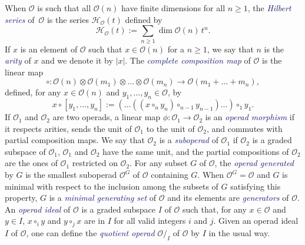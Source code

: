 \documentclass[10pt,reqno]{amsart}
\numberwithin{equation}{subsection}
\renewcommand{\geq}{\geqslant}
\newcommand{\Oca}{\mathcal{O}}
\newcommand{\Hilbert}{\mathcal{H}}
\newcommand{\Def}[1]{\textcolor{MidnightBlue}{\em #1}}
\begin{document}
When $\Oca$ is such that all $\Oca(n)$ have finite dimensions for all
$n \geq 1$, the \Def{Hilbert series} of~$\Oca$ is the series
$\Hilbert_\Oca(t)$ defined by
\begin{equation}
    \Hilbert_\Oca(t) := \sum_{n \geq 1} \dim \Oca(n)\, t^n.
\end{equation}
If $x$ is an element of $\Oca$ such that $x \in \Oca(n)$ for a
$n \geq 1$, we say that $n$ is the \Def{arity} of $x$ and we denote it
by $|x|$. The \Def{complete composition map} of $\Oca$ is the linear map
\begin{equation}
    \circ : \Oca(n) \otimes \Oca(m_1) \otimes \dots \otimes \Oca(m_n)
    \to \Oca(m_1 + \dots + m_n),
\end{equation}
defined, for any $x \in \Oca(n)$ and $y_1, \dots, y_n \in \Oca$, by
\begin{equation}
    x \circ [y_1, \dots, y_n]
    := (\dots ((x \circ_n y_n) \circ_{n - 1} y_{n - 1}) \dots)
    \circ_1 y_1.
\end{equation}
If $\Oca_1$ and $\Oca_2$ are two operads, a linear map
$\phi : \Oca_1 \to \Oca_2$ is an \Def{operad morphism} if it respects
arities, sends the unit of $\Oca_1$ to the unit of $\Oca_2$, and
commutes with partial composition maps. We say that $\Oca_2$ is a
\Def{suboperad} of $\Oca_1$ if $\Oca_2$ is a graded subspace of $\Oca_1$,
$\Oca_1$ and $\Oca_2$ have the same unit, and the partial compositions
of $\Oca_2$ are the ones of $\Oca_1$ restricted on $\Oca_2$. For any
subset $G$ of $\Oca$, the \Def{operad generated} by $G$ is the smallest
suboperad $\Oca^G$ of $\Oca$ containing $G$. When $\Oca^G = \Oca$ and
$G$ is minimal with respect to the inclusion among the subsets of $G$
satisfying this property, $G$ is a \Def{minimal generating set} of
$\Oca$ and its elements are \Def{generators} of $\Oca$. An \Def{operad
ideal} of $\Oca$ is a graded subspace $I$ of $\Oca$ such that, for any
$x \in \Oca$ and $y \in I$, $x \circ_i y$ and $y \circ_j x$ are in $I$
for all valid integers $i$ and $j$. Given an operad ideal $I$ of $\Oca$,
one can define the \Def{quotient operad} $\Oca/_I$ of $\Oca$ by $I$ in
the usual way.
\medskip
\end{document}
